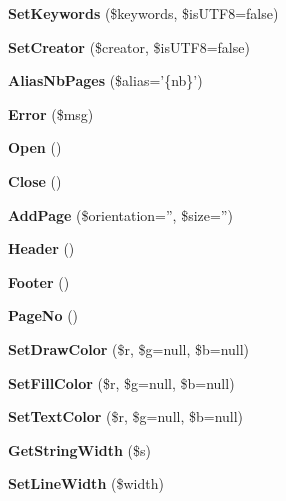 \begin{DoxyCompactItemize}
\item 
{\bfseries Set\+Keywords} (\$keywords, \$is\+U\+T\+F8=false)\label{class_f_p_d_f_a7e4661e4268a8fb243eacb1ee63fd940}

\item 
{\bfseries Set\+Creator} (\$creator, \$is\+U\+T\+F8=false)\label{class_f_p_d_f_a7f0b25d1e942566c5243f3b87a2e3c49}

\item 
{\bfseries Alias\+Nb\+Pages} (\$alias='\{nb\}')\label{class_f_p_d_f_abaa0ba28883e13a200d33a0a765e5927}

\item 
{\bfseries Error} (\$msg)\label{class_f_p_d_f_a5afab85a7aaf19395f9a0e86cae76928}

\item 
{\bfseries Open} ()\label{class_f_p_d_f_a108c38280cadce79d90a9a3cedcbfb80}

\item 
{\bfseries Close} ()\label{class_f_p_d_f_a2fd4e06444aa4ace4cab6d6950ba2bb2}

\item 
{\bfseries Add\+Page} (\$orientation='', \$size='')\label{class_f_p_d_f_a76ce42e38224e33f30113593ed1d718b}

\item 
{\bfseries Header} ()\label{class_f_p_d_f_af476ba4a046025587e6ca04f98918434}

\item 
{\bfseries Footer} ()\label{class_f_p_d_f_a2f39533ba0786237090683635ef01c49}

\item 
{\bfseries Page\+No} ()\label{class_f_p_d_f_a95cd8334f0957fa50b42d5591d988dbc}

\item 
{\bfseries Set\+Draw\+Color} (\$r, \$g=null, \$b=null)\label{class_f_p_d_f_a30dc6a03020966564d6aaeed51809250}

\item 
{\bfseries Set\+Fill\+Color} (\$r, \$g=null, \$b=null)\label{class_f_p_d_f_ad8a03e2c2dfc303bd3b8fddae75995a8}

\item 
{\bfseries Set\+Text\+Color} (\$r, \$g=null, \$b=null)\label{class_f_p_d_f_ae76e9d2786a48fad1ccce6a6bf83e4bc}

\item 
{\bfseries Get\+String\+Width} (\$s)\label{class_f_p_d_f_a917770b3091e6b6ec88b0a01d987ae5d}

\item 
{\bfseries Set\+Line\+Width} (\$width)\label{class_f_p_d_f_a8d1b4277d1df51284db9de92377c5cf0}


\end{DoxyCompactItemize}
